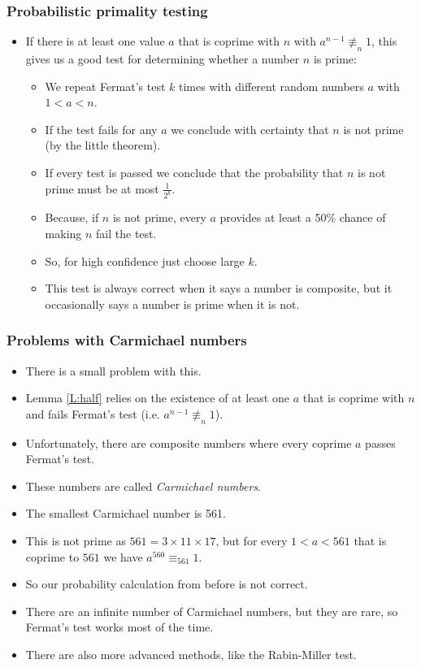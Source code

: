 \documentclass[handout]{beamer}
\begin{document}
\begin{frame}
\frametitle{Probabilistic primality testing}
\begin{itemize} 
\item If there is at least one value $a$ that is coprime with $n$ with $a^{n-1}\not\equiv_n 1$, this gives us a good test for determining whether a number $n$ is prime: \vspace{0.2cm} 
\begin{itemize}
\item We repeat Fermat's test $k$ times with different random numbers $a$ with $1<a<n$. 
\vspace{0.2cm} 
\item If the test fails for any $a$ we conclude with certainty that $n$ is not prime (by the little theorem). 
\vspace{0.2cm} 
\item If every test is passed we conclude that the probability that $n$ is not prime must be at most $\frac{1}{2^k}$.
\vspace{0.2cm}  
\item Because, if $n$ is not prime, every $a$ provides at least a 50\% chance of making $n$ fail the test. 
\vspace{0.2cm} 
\item So, for high confidence just choose large $k$.
\vspace{0.2cm} 
\item This test is always correct when it says a number is composite, but it occasionally says a number is prime when it is not.
\end{itemize}
\end{itemize}

\end{frame}

\begin{frame}
\frametitle{Problems with Carmichael numbers}
\begin{itemize}
\item There is a small problem with this. 
\item Lemma \ref{L:half} relies on the existence of at least one $a$ that is coprime with $n$ and fails Fermat's test (i.e. $a^{n-1}\not\equiv_n 1$). 
\item Unfortunately, there are composite numbers where every coprime $a$ passes Fermat's test. 
\item These numbers are called \emph{Carmichael numbers}. 
\item The smallest Carmichael number is 561. 
\item This is not prime as $561 = 3\times 11 \times 17$, but for every $1<a<561$ that is coprime to $561$ we have $a^{560}\equiv_{561} 1$. 
\item So our probability calculation from before is not correct. 
\item There are an infinite number of Carmichael numbers, but they are rare, so Fermat's test works most of the time. 
\item There are also more advanced methods, like the Rabin-Miller test.  
\end{itemize}
\end{frame}
\end{document}
